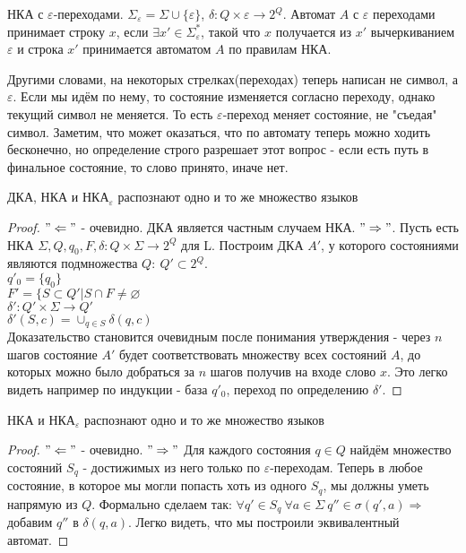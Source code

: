\begin{conj}
    НКА с $\varepsilon$-переходами. $\Sigma_\varepsilon = \Sigma \cup \{\varepsilon\}$, $\delta : Q \times \varepsilon \to 2^Q$. 
    Автомат $A$ с $\varepsilon$ переходами принимает строку $x$, если $\exists x' \in \Sigma^*_\varepsilon$, такой что $x$ получается из $x'$ вычеркиванием $\varepsilon$ и 
    строка $x'$ принимается автоматом $A$ по правилам НКА.
\end{conj}

Другими словами, на некоторых стрелках(переходах) теперь написан не символ, а $\varepsilon$. Если мы идём по нему, то состояние изменяется согласно переходу, однако текущий символ не меняется. То есть $\varepsilon$-переход меняет состояние, не "съедая" символ. 
Заметим, что может оказаться, что по автомату теперь можно ходить бесконечно, но определение строго разрешает этот вопрос - если есть путь в финальное состояние, то слово принято, иначе нет.

\begin{theorem}
    ДКА, НКА и $\text{НКА}_\varepsilon$ распознают одно и то же множество языков
\end{theorem}

\begin{proof}
    $"\Leftarrow"$ - очевидно. ДКА является частным случаем НКА.
    $"\Rightarrow"$. Пусть есть НКА $\Sigma, Q, q_0, F, \delta : Q \times \Sigma \to 2^Q$ для L. Построим ДКА $A'$, у которого состояниями являются подмножества $Q:\ Q' \subset 2^Q$.\\
    $q'_0 = \{q_0\}$\\
    $F' = \{S \subset Q' | S \cap F \neq \varnothing$\\
    $\delta' : Q' \times \Sigma \to Q'$\\
    $\delta'(S, c) = \cup_{q \in S} \delta(q, c)$\\
    Доказательство становится очевидным после понимания утверждения - через $n$ шагов состояние $A'$ будет соответствовать множеству всех состояний $A$, до которых можно было добраться за $n$ шагов получив на входе слово $x$. 
    Это легко видеть например по индукции - база $q'_0$, переход по определению $\delta'$.
\end{proof}

\begin{theorem}
    НКА и $\text{НКА}_\varepsilon$ распознают одно и то же множество языков
\end{theorem}

\begin{proof}
    $"\Leftarrow"$ - очевидно.
    $"\Rightarrow"$ Для каждого состояния $q \in Q$ найдём множество состояний $S_q$ - достижимых из него только по $\varepsilon$-переходам.
    Теперь в любое состояние, в которое мы могли попасть хоть из одного $S_q$, мы должны уметь напрямую из $Q$. Формально сделаем так: 
    $\forall q' \in S_q\ \forall a \in \Sigma\ q'' \in \sigma(q', a) \Rightarrow$ добавим $q''$ в $\delta(q, a)$. Легко видеть, что мы построили эквивалентный автомат.
\end{proof}

